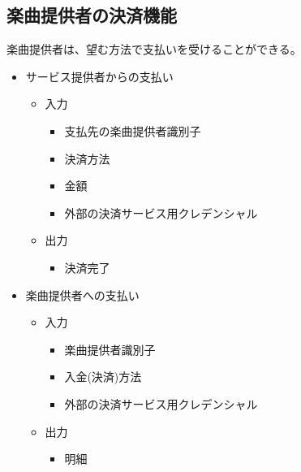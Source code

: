 \documentclass[a4paper,10pt]{jsarticle}
\begin{document}
\subsection{楽曲提供者の決済機能}
楽曲提供者は、望む方法で支払いを受けることができる。
\begin{itemize}
  \item サービス提供者からの支払い
        \begin{itemize}
          \item 入力
                \begin{itemize}
                  \item 支払先の楽曲提供者識別子
                  \item 決済方法
                  \item 金額
                  \item 外部の決済サービス用クレデンシャル
                \end{itemize}
          \item 出力
                \begin{itemize}
                  \item 決済完了
                \end{itemize}
        \end{itemize}
  \item 楽曲提供者への支払い
        \begin{itemize}
          \item 入力
                \begin{itemize}
                  \item 楽曲提供者識別子
                  \item 入金(決済)方法
                  \item 外部の決済サービス用クレデンシャル
                \end{itemize}
          \item 出力
                \begin{itemize}
                  \item 明細
                \end{itemize}
        \end{itemize}
\end{itemize}
\end{document}
